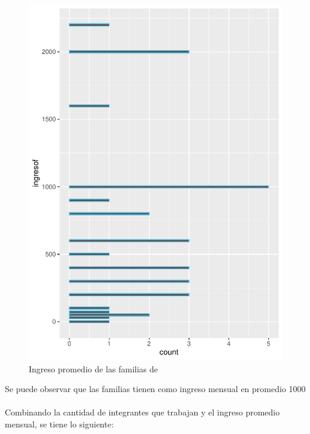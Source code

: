 \documentclass[12pt]{article}\usepackage[]{graphicx}\usepackage[]{xcolor}
\makeatletter
\def\maxwidth{ %
  \ifdim\Gin@nat@width>\linewidth
    \linewidth
  \else
    \Gin@nat@width
  \fi
}
\newenvironment{kframe}{%
 \def\at@end@of@kframe{}%
 \ifinner\ifhmode%
  \def\at@end@of@kframe{\end{minipage}}%
  \begin{minipage}{\columnwidth}%
 \fi\fi%
 \def\FrameCommand##1{\hskip\@totalleftmargin \hskip-\fboxsep
 \colorbox{shadecolor}{##1}\hskip-\fboxsep
     \hskip-\linewidth \hskip-\@totalleftmargin \hskip\columnwidth}%
 \MakeFramed {\advance\hsize-\width
   \@totalleftmargin\z@ \linewidth\hsize
   \@setminipage}}%
 {\par\unskip\endMakeFramed%
 \at@end@of@kframe}
\newenvironment{knitrout}{}{} %
\makeatother
\begin{document}
	\begin{figure}[H]
	\centering
\begin{knitrout}
\color{fgcolor}\begin{kframe}


{\ttfamily\noindent\color{warningcolor}{\#\# Warning: Removed 1 rows containing non-finite values (`stat\_count()`).}}\end{kframe}
\includegraphics[width=\maxwidth]{figure/veinte-1} 
\end{knitrout}
	\caption{Ingreso promedio de las familias de \comunidad}
	\end{figure}
	Se puede observar que las familias tienen como ingreso mensual en promedio 1000\\
	\\
	Combinando la cantidad de integrantes que trabajan y el ingreso promedio mensual, se tiene lo siguiente:
	
\end{document}
